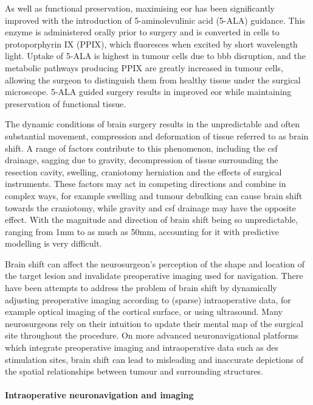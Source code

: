 As well as functional preservation, maximising \gls{eor} has been significantly improved with the introduction of 5-aminolevulinic acid (5-ALA)  guidance.
This enzyme  is administered orally prior to surgery and is converted in cells to protoporphyrin IX (PPIX), which fluoresces when excited by short wavelength light.
Uptake of 5-ALA is highest in tumour cells due to \gls{bbb} disruption, and the metabolic pathways producing PPIX are greatly increased in tumour cells, allowing the surgeon to distinguish them from healthy tissue under the surgical microscope.
5-ALA guided surgery results in improved \gls{eor} while maintaining preservation of functional tissue\autocite{Coburger2019}.

The dynamic conditions of brain surgery results in the unpredictable and often substantial movement, compression and deformation of tissue referred to as brain shift.
A range of factors contribute to this phenomenon, including the \gls{csf} drainage, sagging due to gravity, decompression of tissue surrounding the resection cavity, swelling, craniotomy herniation and the effects of surgical instruments\autocite{Gerard2017}.
These factors may act in competing directions and combine in complex ways, for example swelling and tumour debulking can cause brain shift towards the craniotomy, while gravity and \gls{csf} drainage may have the opposite effect.
With the magnitude and direction of brain shift being so unpredictable, ranging from 1mm to as much as 50mm\autocite{Gerard2017}, accounting for it with predictive modelling is very difficult.

Brain shift can affect the neurosurgeon's perception of the shape and location of the target lesion  and invalidate preoperative imaging used for navigation.
There have been attempts to address the problem of brain shift by dynamically adjusting preoperative imaging according to (sparse) intraoperative data, for example optical imaging of the cortical surface, or using ultrasound. 
Many neurosurgeons rely on their intuition to update their mental map of the surgical site throughout the procedure.
On more advanced neuronavigational platforms which integrate preoperative imaging and intraoperative data such as \gls{des} stimulation sites, brain shift can lead to misleading and inaccurate depictions of the spatial relationships between tumour and surrounding structures.

\paragraph*{Intraoperative neuronavigation and imaging}



